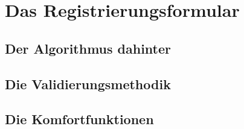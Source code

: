 \chapter{Das Registrierungsformular}
\section{Der Algorithmus dahinter}

\section{Die Validierungsmethodik}

\section{Die Komfortfunktionen}
